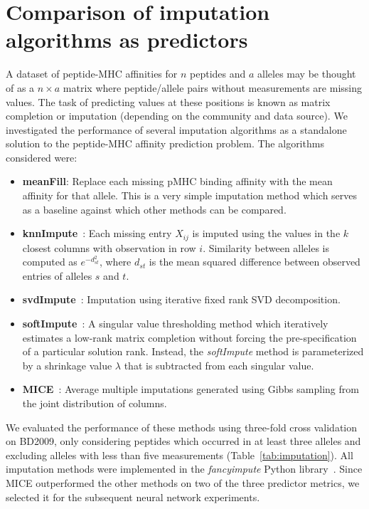 \section{Comparison of imputation algorithms as predictors}

A dataset of peptide-MHC affinities for $n$ peptides and $a$ alleles may be thought of as a $n \times a$ matrix where peptide/allele pairs without measurements are missing values. The task of predicting values at these positions is known as matrix completion or imputation (depending on the community and data source).  We investigated the performance of several imputation algorithms as a standalone solution to the peptide-MHC affinity prediction problem. The algorithms considered were:

\begin{itemize}
\item {\bf meanFill}: Replace each missing pMHC binding affinity with the mean affinity for that allele. This is a very simple imputation method which serves as a baseline against which other methods can be compared. 

\item {\bf knnImpute}~\cite{Troyanskaya_2001}: Each missing entry $X_{ij}$ is imputed using the values in the $k$ closest columns with observation in row $i$.  Similarity between alleles is computed as $e^{-d_{st}^2}$, where $d_{st}$ is the mean squared difference between observed entries of alleles $s$ and $t$. 

\item {\bf svdImpute}~\cite{Troyanskaya_2001}: Imputation using iterative fixed rank SVD decomposition. 

\item {\bf softImpute}~\cite{Mazumder2010SpectralMatrices}: A singular value thresholding method which iteratively estimates a low-rank matrix completion without forcing the pre-specification of a particular solution rank. Instead, the {\it softImpute} method is parameterized by a shrinkage value $\lambda$ that is subtracted from each singular value. 

\item {\bf MICE}~\cite{Azur_2011}: Average multiple imputations generated using Gibbs sampling from the joint distribution of columns. 
\end{itemize}

We evaluated the performance of these methods using three-fold cross validation on BD2009, only considering peptides which occurred in at least three alleles and excluding alleles with less than five measurements (Table~\ref{tab:imputation}). All imputation methods were implemented in the \textit{fancyimpute} Python library~\cite{fancyimpute-0-0-16}. Since MICE outperformed the other methods on two of the three predictor metrics, we selected it for the subsequent neural network experiments.


